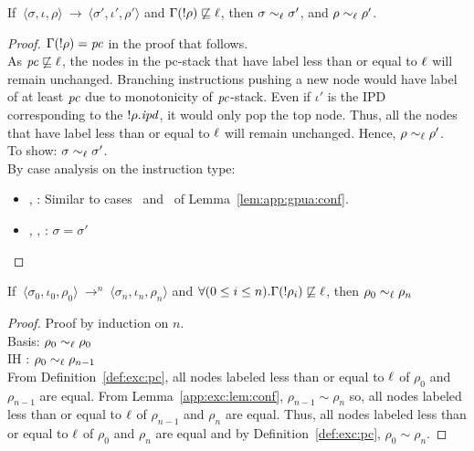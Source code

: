 \begin{myLemma}
\label{app:exc:lem:conf}
If $~\langle \sigma, \iota, \rho \rangle~\rightarrow~\langle \sigma',
\iota', \rho' \rangle$ and $\Gamma(!\rho) \not\sqsubseteq \ell$, then
$\sigma \sim_\ell \sigma'$, and $\rho \sim_\ell \rho'$.
\end{myLemma}
\begin{proof}
$\Gamma(!\rho) = \mathit{pc}$ in the proof that follows.\\
As $\mathit{pc} \not\sqsubseteq \ell$, the nodes in the pc-stack 
that have label less than or equal to $\ell$ will remain
unchanged. Branching instructions pushing a new node would have label
of at least $\mathit{pc}$ due to monotonicity of $\mathit{pc}$-stack. Even if
$\iota'$ is the IPD corresponding to the $!\rho.\mathit{ipd}$, it would only
pop the top node. Thus, all the nodes that have label less than or
equal to $\ell$ will remain unchanged. Hence, $\rho \sim_\ell \rho'$.\\
To show: $\sigma \sim_\ell \sigma'$. \\
By case analysis on the instruction type: 
\begin{itemize}
\item {}, : Similar to cases~
  and~ of Lemma~\ref{lem:app:gpua:conf}.
\item {}, , : $\sigma = \sigma'$
\end{itemize}
\end{proof}

\begin{myLemma}
\label{app:exc:lem:pcstack}
If $~\langle \sigma_0, \iota_0, \rho_0 \rangle~\rightarrow^{n}~\langle
\sigma_n, \iota_n, \rho_n \rangle$ and $\forall (0 \leq i \leq
n).\Gamma(!\rho_i) \not\sqsubseteq \ell$, then  $\rho_0 \sim_\ell \rho_n$
\end{myLemma}
\begin{proof}
Proof by induction on $n$. \\
Basis: $\rho_0 \sim_\ell \rho_0$\\
IH : $\rho_0 \sim_\ell \rho_{n-1}$\\
From Definition~\ref{def:exc:pc}, all nodes labeled less than or equal
to $\ell$ of $\rho_0$ and $\rho_{n-1}$ are equal. From
Lemma~\ref{app:exc:lem:conf}, $\rho_{n-1} \sim \rho_n$ so, all nodes
labeled less than or equal to $\ell$ of $\rho_{n-1}$ and $\rho_n$ are
equal. Thus, all nodes labeled less than or equal to $\ell$ of
$\rho_0$ and $\rho_n$ are equal and by Definition~\ref{def:exc:pc},
$\rho_0 \sim \rho_n$.
\end{proof}

